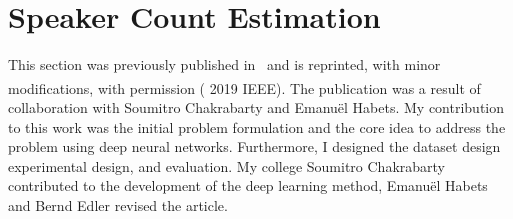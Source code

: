 








\section{Speaker Count Estimation}%
\label{sec:count_experiment}

\begin{shaded}
This section was previously published in~\cite{stoeter19} and is reprinted, with minor modifications, with permission (\textsuperscript{\textregistered} 2019 IEEE). The publication was a result of collaboration with Soumitro Chakrabarty and Emanuël Habets. 
My contribution to this work was the initial problem formulation and the core idea to address the problem using deep neural networks. Furthermore, I designed the dataset design experimental design, and evaluation.
My college Soumitro Chakrabarty contributed to the development of the deep learning method, Emanuël Habets and Bernd Edler revised the article.
\end{shaded}

